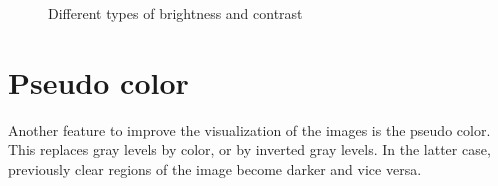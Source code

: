 \begin{figure}[!h]
  \centering
   \qquad
  \caption{Different types of brightness and contrast}
  \label{fig:two_window_level}
\end{figure}

\section{Pseudo color}

Another feature to improve the visualization of the images is the pseudo color. This replaces gray levels by color, or by inverted gray levels. In the latter case, previously clear regions of the image become darker and vice versa.

